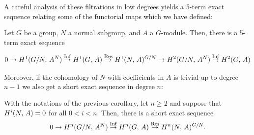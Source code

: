 \documentclass[a4paper, oneside]{memoir}
\begin{document}
A careful analysis of these filtrations in low degrees yields a 5-term exact sequence relating some of the functorial maps which we have defined:

\begin{corollary}\label{cor:LowDegree}
    Let $G$ be a group, $N$ a normal subgroup, and $A$ a $G$-module. Then, there is a 5-term exact sequence

    \[
        0\to H^{1}( G / N, \, A^N )\overset{\operatorname{Inf}}{\to} H^{1}( G, \, A )\overset{\operatorname{Res}}{\to} H^{1}( N, \, A )^{G /N} \to H^{2}( G /N, \, A^N )\overset{\operatorname{Inf}}{\to} H^{2}( G, \, A )
    \]

\end{corollary}

Moreover, if the cohomology of $N$ with coefficients in $A$ is trivial up to degree $n-1$ we also get a short exact sequence in degree $n$:

\begin{corollary}\label{cor:InfRes}
    With the notations of the previous corollary, let $n\geq 2$ and suppose that $H^{i}( N, \, A )=0$ for all $0 < i < n$.
    Then, there is a short exact sequence
    \[
        0\to H^{n}( G / N, \, A^N )\overset{\operatorname{Inf}}{\to} H^{n}( G, \, A )\overset{\operatorname{Res}}{\to} H^{n}( N, \, A )^{G /N}.
    \]
\end{corollary}
\end{document}
